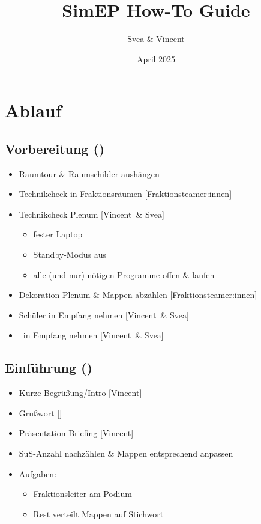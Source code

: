 \documentclass{article}
\title{SimEP How-To Guide}
\author{Svea \& Vincent}
\date{April 2025}
\newcommand{\KOM}{Vincent}
\newcommand{\EP}{Svea}
\newcommand{\KOM}{Svea}
\newcommand{\EP}{Vincent}
\begin{document}
	\section{Ablauf}
	\subsection{Vorbereitung (\timeVorb)}
	\begin{itemize}
		\item Raumtour \& Raumschilder aushängen
        \item Technikcheck in Fraktionsräumen [Fraktionsteamer:innen]
		\item Technikcheck Plenum [\KOM\ \& \EP]
		\begin{itemize}
			\item fester Laptop
			\item Standby-Modus aus
			\item alle (und nur) nötigen Programme offen \& laufen
		\end{itemize}
		\item Dekoration Plenum \& Mappen abzählen [Fraktionsteamer:innen]
		\item Schüler in Empfang nehmen [\KOM\ \& \EP]
		\item \politiker\ in Empfang nehmen [\KOM\ \& \EP]		
	\end{itemize}
	
	\subsection{Einführung (\timeEinf)}
	\begin{itemize}
		\item Kurze Begrüßung/Intro [\KOM]
		\item Grußwort [\politiker]
		\item Präsentation Briefing [\KOM]
        \item SuS-Anzahl nachzählen \& Mappen entsprechend anpassen
        \item Aufgaben:
        \begin{itemize}
            \item Fraktionsleiter am Podium
            \item Rest verteilt Mappen auf Stichwort
        \end{itemize}
    \end{itemize}
	
\end{document}
